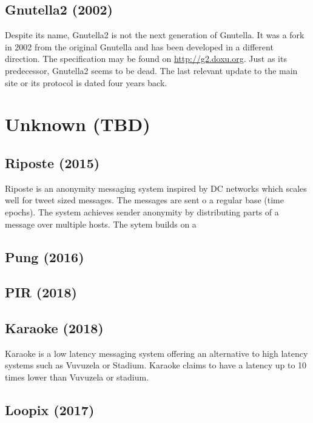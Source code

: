 \subsection{Gnutella2 (2002)}
Despite its name, Gnutella2 is not the next generation of Gnutella. It was a fork in 2002 from the original Gnutella and has been developed in a different direction. The specification may be found on \url{http://g2.doxu.org}. Just as its predecessor, Gnutella2 seems to be dead. The last relevant update to the main site or its protocol is dated four years back.

\section{Unknown (TBD)}
\subsection{Riposte (2015)}
Riposte\cite{corrigan2015riposte} is an anonymity messaging system inspired by DC networks which scales well for tweet sized messages. The messages are sent o a regular base (time epochs). The system achieves sender anonymity by distributing parts of a message over multiple hosts. The sytem builds on a 

%

\subsection{Pung (2016)}
\cite{angel2016unobservable}

%

\subsection{PIR (2018)}
\cite{angel2018pir}

%

\subsection{Karaoke (2018)}
Karaoke\cite{lazar2018karaoke} is a low latency messaging system offering an alternative to high latency systems such as Vuvuzela or Stadium. Karaoke claims to have a latency up to 10 times lower than Vuvuzela or stadium.

%

\subsection{Loopix (2017)}
\cite{piotrowska2017loopix}

